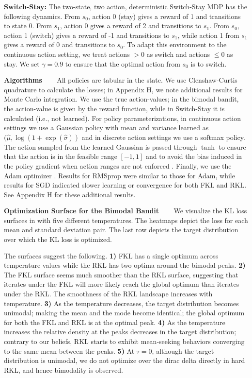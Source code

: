 \documentclass[twoside,11pt]{article}
\newcommand{\myparagraph}[1]{\textbf{#1} \ \ \ }
\begin{document}
\textbf{Switch-Stay:} The two-state, two action, deterministic Switch-Stay MDP has the following dynamics. From $s_0$, action $0$ (stay) gives a reward of 1 and transitions to state $0$. From $s_1$, action 0 gives a reward of 2 and transitions to $s_1$. From $s_0$, action 1 (switch) gives a reward of -1 and transitions to $s_1$, while action 1 from $s_1$ gives a reward of 0 and transitions to $s_0$. 
To adapt this environment to the continuous action setting, we treat actions $> 0$ as switch and actions $\leq 0$ as stay.  We set $\gamma = 0.9$ to ensure that the optimal action from $s_0$ is to switch. 

\myparagraph{Algorithms} 
All policies are tabular in the state. We use Clenshaw-Curtis quadrature \citep{clenshaw1960method} to calculate the losses; in Appendix H, we note additional results for Monte Carlo integration. We use the true action-values; in the bimodal bandit, the action-value is given by the reward function, while in Switch-Stay it is calculated (i.e., not learned). For policy parameterizations, in continuous action settings we use a Gaussian policy with mean and variance learned as $(\hat{\mu}, \log(1+\exp(\hat{\sigma}))$ and in discrete action settings we use a softmax policy. The action sampled from the learned Gaussian is passed through $\tanh$ to ensure that the action is in the feasible range $[-1, 1]$ and to avoid the bias induced in the policy gradient when action ranges are not enforced \citep{chou2017improving}. Finally, we use the Adam optimizer \citep{kingma2014adam}. Results for RMSprop were similar to those for Adam, while results for SGD indicated slower learning or convergence for both FKL and RKL. See Appendix H for these additional results. 


\myparagraph{Optimization Surface for the Bimodal Bandit}
We visualize the KL loss surfaces in  with five different temperatures. The heatmaps depict the loss for each mean and standard deviation pair. The last row depicts the target distribution over which the KL loss is optimized. 

The surfaces suggest the following. 
\textbf{1)} FKL has a single optimum across temperature values while the RKL has two optima around the bimodal peaks.
\textbf{2)} The FKL surface seems much smoother than the RKL surface, suggesting that iterates under the FKL will more likely reach the global optimum than iterates under the RKL. The smoothness of the RKL landscape increases with temperature.
\textbf{3)} As the temperature decreases, the target distribution becomes unimodal; making the mean and the mode become identical; the global optimum for both the FKL and RKL is at the optimal peak.
\textbf{4)} As the temperature increases the relative density at the peaks decreases in the target distribution; contrary to our beliefs, RKL starts to exhibit mean-seeking behaviors converging to the same mean between the peaks. 
\textbf{5)} At $\tau=0$, although the target distribution is unimodal, we do not optimize over the dirac delta directly in hard RKL, and hence bimodality is observed.
\end{document}

